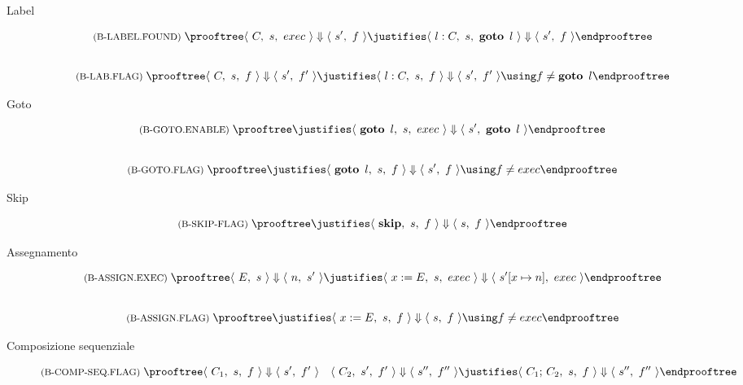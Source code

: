 \begin{description}

\item[Label]
\begin{gather*}
  \rulename{B-LABEL.FOUND}
  \prooftree
    \configG{C}{s}{exec} \Downarrow \config{s'}{f}
    \justifies \configG{\lab{l}{C}}{s}{\goto{l}} \Downarrow \config{s'}{f}
  \endprooftree
  \\[2em]
  \rulename{B-LAB.FLAG}
  \prooftree
    \configG{C}{s}{f} \Downarrow \config{s'}{f'}
    \justifies \configG{\lab{l}{C}}{s}{f} \Downarrow \config{s'}{f'}
    \using f \neq \goto{l}
  \endprooftree
\end{gather*}

\item[Goto]
\begin{gather*}
  \rulename{B-GOTO.ENABLE}
  \prooftree
    \justifies \configG{\goto{l}}{s}{exec} \Downarrow \config{s'}{\goto{l}}
  \endprooftree
  \\[2em]
  \rulename{B-GOTO.FLAG}
  \prooftree
    \justifies \configG{\goto{l}}{s}{f} \Downarrow \config{s'}{f}
    \using f \neq exec
  \endprooftree  
\end{gather*}

\item[Skip]
\begin{gather*}
  \rulename{B-SKIP-FLAG}  
  \prooftree
    \justifies
      \configG{\kw{skip}}{s}{f} \Downarrow \config{s}{f}
  \endprooftree
\end{gather*}

\item[Assegnamento]
\begin{gather*}
  \rulename{B-ASSIGN.EXEC}  
  \prooftree
    \config{E}{s} \Downarrow \config{n}{s'}
    \justifies
      \configG{x:=E}{s}{exec} \Downarrow \config{\assign{s'}{x}{n}}{exec}
  \endprooftree
  \\[2em]
  \rulename{B-ASSIGN.FLAG}  
  \prooftree
    \justifies
      \configG{x:=E}{s}{f} \Downarrow \config{s}{f}
    \using f \neq exec
  \endprooftree
\end{gather*}

\item[Composizione sequenziale]
\begin{gather*}
  \rulename{B-COMP-SEQ.FLAG}
  \prooftree
    \configG{C_1}{s}{f} \Downarrow \config{s'}{f'}
      \quad 
      \configG{C_2}{s'}{f'} \Downarrow \config{s''}{f''}
    \justifies
      \configG{\textrm{$C_1$; $C_2$}}{s}{f} \Downarrow \config{s''}{f''}
  \endprooftree
\end{gather*}


\end{description}
